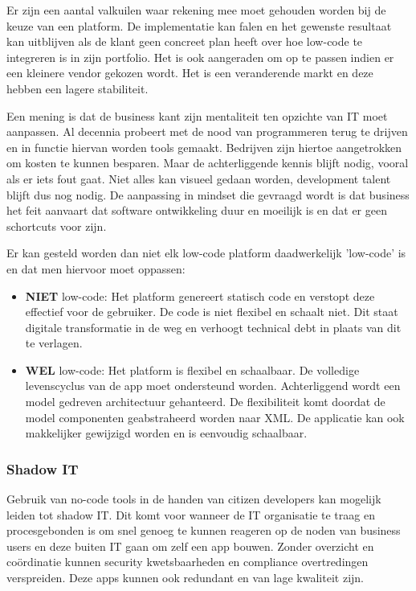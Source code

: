 Er zijn een aantal valkuilen waar rekening mee moet gehouden worden bij de keuze van een platform. De implementatie kan falen en het gewenste resultaat kan uitblijven als de klant geen concreet plan heeft over hoe low-code te integreren is in zijn portfolio. Het is ook aangeraden om op te passen indien er een kleinere vendor gekozen wordt. Het is een veranderende markt en deze hebben een lagere stabiliteit. \autocite{Richardson2016}

Een mening is dat de business kant zijn mentaliteit ten opzichte van IT moet aanpassen. Al decennia probeert met de nood van programmeren terug te drijven en in functie hiervan worden tools gemaakt. Bedrijven zijn hiertoe aangetrokken om kosten te kunnen besparen. Maar de achterliggende kennis blijft nodig, vooral als er iets fout gaat. Niet alles kan visueel gedaan worden, development talent blijft dus nog nodig. De aanpassing in mindset die gevraagd wordt is dat business het feit aanvaart dat software ontwikkeling duur en moeilijk is en dat er geen schortcuts voor zijn. \autocite{Reselman2018}

Er kan gesteld worden dan niet elk low-code platform daadwerkelijk 'low-code' is en dat men hiervoor moet oppassen:
\begin{itemize}
    \item \textbf{NIET} low-code: Het platform genereert statisch code en verstopt deze effectief voor de gebruiker. De code is niet flexibel en schaalt niet. Dit staat digitale transformatie in de weg en verhoogt technical debt in plaats van dit te verlagen.
    \item \textbf{WEL} low-code: Het platform is flexibel en schaalbaar. De volledige levenscyclus van de app moet ondersteund worden. Achterliggend wordt een model gedreven architectuur gehanteerd. De flexibiliteit komt doordat de model componenten geabstraheerd worden naar XML. De applicatie kan ook makkelijker gewijzigd worden en is eenvoudig schaalbaar.
\end{itemize} \autocite{Shiah2018}

\subsubsection{Shadow IT}

Gebruik van no-code tools in de handen van citizen developers kan mogelijk leiden tot shadow IT. Dit komt voor wanneer de IT organisatie te traag en procesgebonden is om snel genoeg te kunnen reageren op de noden van business users en deze buiten IT gaan om zelf een app bouwen. Zonder overzicht en coördinatie kunnen security kwetsbaarheden en compliance overtredingen verspreiden. Deze apps kunnen ook redundant en van lage kwaliteit zijn. \autocite{Bloomberg2017}

